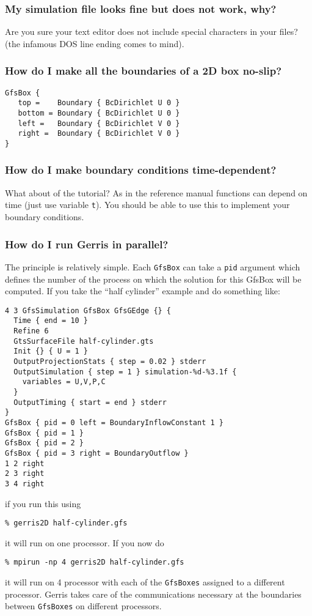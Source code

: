 \documentclass[a4paper]{article}
\begin{document}
\subsubsection{My simulation file looks fine but does not work, why?}

Are you sure your text editor does not
include special characters in your files? (the infamous DOS line ending
comes to mind).

\subsubsection{How do I make all the boundaries of a 2D box no-slip?}

\begin{verbatim}
GfsBox {
   top =    Boundary { BcDirichlet U 0 }
   bottom = Boundary { BcDirichlet U 0 }
   left =   Boundary { BcDirichlet V 0 }
   right =  Boundary { BcDirichlet V 0 }
}
\end{verbatim}

\subsubsection{How do I make boundary conditions time-dependent?}

What about  of the tutorial?
As  in the reference manual
functions can depend on time (just use variable {\tt t}). You should
be able to use this to implement your boundary conditions.

\subsubsection{How do I run Gerris in parallel?}

The principle is relatively simple. Each {\tt GfsBox} can take a {\tt pid}
argument which defines the number of the process on which the solution
for this GfsBox will be computed. If you take the ``half cylinder''
example and do something like:
\begin{verbatim}
4 3 GfsSimulation GfsBox GfsGEdge {} {
  Time { end = 10 }
  Refine 6
  GtsSurfaceFile half-cylinder.gts
  Init {} { U = 1 }
  OutputProjectionStats { step = 0.02 } stderr
  OutputSimulation { step = 1 } simulation-%d-%3.1f {
    variables = U,V,P,C
  }
  OutputTiming { start = end } stderr
}
GfsBox { pid = 0 left = BoundaryInflowConstant 1 }
GfsBox { pid = 1 }
GfsBox { pid = 2 }
GfsBox { pid = 3 right = BoundaryOutflow }
1 2 right
2 3 right
3 4 right
\end{verbatim}
if you run this using
\begin{verbatim}
% gerris2D half-cylinder.gfs
\end{verbatim}
it will run on one processor. If you now do
\begin{verbatim}
% mpirun -np 4 gerris2D half-cylinder.gfs
\end{verbatim}
it will run on 4 processor with each of the {\tt GfsBoxes} assigned to a
different processor. Gerris takes care of the communications necessary
at the boundaries between {\tt GfsBoxes} on different processors.
\end{document}
